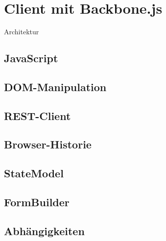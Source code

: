 \section[Client]{Client mit Backbone.js}

\begin{frame}{Architektur}
  \begin{center}
    
  \end{center}
\end{frame}

\subsection{JavaScript}


\subsection{DOM-Manipulation}


\subsection{REST-Client}


\subsection{Browser-Historie}


\subsection{StateModel}


\subsection{FormBuilder}


\subsection{Abhängigkeiten}


